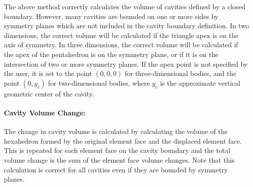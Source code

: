 The above method correctly calculates the volume of cavities defined by
a closed boundary.  However, many cavities are bounded on one or more
sides by symmetry planes which are not included in the cavity boundary
definition.  In two dimensions, the correct volume will be calculated if
the triangle apex is on the axis of symmetry.  In three dimensions, the
correct volume will be calculated if the apex of the pentahedron is on
the symmetry plane, or if it is on the intersection of two or more
symmetry planes.  If the apex point is not specified  by the user, it is
set to the point $(0,0,0)$ for three-dimensional bodies, and the point
$(0,y_c)$ for two-dimensional bodies, where $y_c$ is the approximate
vertical geometric center of the cavity. 

\paragraph*{Cavity Volume Change:}
The change in cavity volume is calculated by calculating the volume of
the hexahedron formed by the original element face and the displaced
element face.  This is repeated for each element face on the cavity
boundary and the total volume change is the sum of the element face
volume changes.  Note that this calculation is correct for all cavities
even if they are bounded by symmetry planes. 

